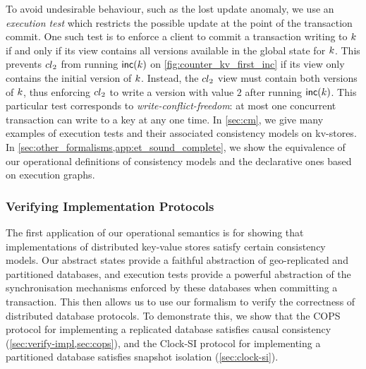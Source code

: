 To avoid undesirable behaviour, such as the lost update anomaly, we
use an {\em execution test} which restricts the possible update at the
point of the transaction commit.  One such test is to enforce a client
to commit a transaction writing to \(k\) if and only if its view
contains all versions available in the global state for \(k\).  This
prevents \({cl}_2\) from running \(\mathsf{inc}(k)\) on
\cref{fig:counter_kv_first_inc} if its view only contains the initial
version of \(k\).  Instead, the \({cl}_2\) view must contain both
versions of \(k\), thus enforcing \({cl}_2\) to write a version with
value \(2\) after running \(\mathsf{inc}(k)\). This particular test
corresponds to \emph{write-conflict-freedom}:
at most one concurrent transaction can write to a key at any one time.
In \cref{sec:cm}, we give many examples of execution tests and their
associated consistency models on kv-stores. 
In \cref{sec:other_formalisms,app:et_sound_complete},
we show the equivalence of our operational definitions of consistency models and 
the declarative ones based on execution graphs. 

\subsubsection{Verifying Implementation Protocols} 
The first application of our operational
semantics is for showing that implementations of distributed
key-value stores satisfy certain consistency models. 
Our abstract states provide a 
faithful abstraction of geo-replicated and partitioned
databases, and execution tests provide a powerful abstraction of the synchronisation mechanisms 
enforced by these databases when committing a transaction. 
This then allows us to use our 
formalism to verify the correctness of distributed database protocols. 
To demonstrate this, we show that the
COPS protocol \citep{cops} for implementing a replicated database satisfies causal consistency  (\cref{sec:verify-impl,sec:cops}), 
and the Clock-SI protocol \citep{clocksi} for implementing a
partitioned database satisfies snapshot isolation (\cref{sec:clock-si}). 


